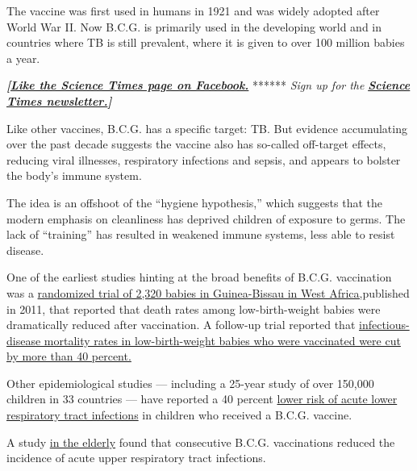 The vaccine was first used in humans in 1921 and was widely adopted
after World War II. Now B.C.G. is primarily used in the developing world
and in countries where TB is still prevalent, where it is given to over
100 million babies a year.

\textbf{\emph{{[}}\href{http://on.fb.me/1paTQ1h}{\emph{Like the Science
Times page on Facebook.}}} ****** \emph{\textbar{} Sign up for the}
\textbf{\href{http://nyti.ms/1MbHaRU}{\emph{Science Times
newsletter.}}\emph{{]}}}

Like other vaccines, B.C.G. has a specific target: TB. But evidence
accumulating over the past decade suggests the vaccine also has
so-called off-target effects, reducing viral illnesses, respiratory
infections and sepsis, and appears to bolster the body's immune system.

The idea is an offshoot of the ``hygiene hypothesis,'' which suggests
that the modern emphasis on cleanliness has deprived children of
exposure to germs. The lack of ``training'' has resulted in weakened
immune systems, less able to resist disease.

One of the earliest studies hinting at the broad benefits of B.C.G.
vaccination was a
\href{https://www.ncbi.nlm.nih.gov/pubmed/21673035}{randomized trial of
2,320 babies in Guinea-Bissau in West Africa,}published in 2011, that
reported that death rates among low-birth-weight babies were
dramatically reduced after vaccination. A follow-up trial reported that
\href{https://www.ncbi.nlm.nih.gov/pubmed/29579158}{infectious-disease
mortality rates in low-birth-weight babies who were vaccinated were cut
by more than 40 percent.}

Other epidemiological studies --- including a 25-year study of over
150,000 children in 33 countries --- have reported a 40 percent
\href{https://pubmed.ncbi.nlm.nih.gov/25725054/?from_single_result=2015\%2C+de+castro+mj\%2C+clinical+infectious+disease\&expanded_search_query=2015\%2C+de+castro+mj\%2C+clinical+infectious+disease}{lower
risk of acute lower respiratory tract infections} in children who
received a B.C.G. vaccine.

A study
\href{https://www.ncbi.nlm.nih.gov/pubmed/?term=wardhana\%2C+BCG\%2C+elderly}{in
the elderly} found that consecutive B.C.G. vaccinations reduced the
incidence of acute upper respiratory tract infections.

\href{https://www.nytimes3xbfgragh.onion/news-event/coronavirus?action=click\&pgtype=Article\&state=default\&region=MAIN_CONTENT_3\&context=storylines_faq}{}

